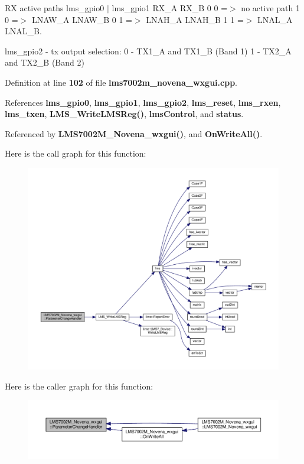 RX active paths lms\+\_\+gpio0 $\vert$ lms\+\_\+gpio1 R\+X\+\_\+A R\+X\+\_\+B 0 0 =$>$ no active path 1 0 =$>$ L\+N\+A\+W\+\_\+A L\+N\+A\+W\+\_\+B 0 1 =$>$ L\+N\+A\+H\+\_\+A L\+N\+A\+H\+\_\+B 1 1 =$>$ L\+N\+A\+L\+\_\+A L\+N\+A\+L\+\_\+B. 

lms\+\_\+gpio2 -\/ tx output selection\+: 0 -\/ T\+X1\+\_\+A and T\+X1\+\_\+B (Band 1) 1 -\/ T\+X2\+\_\+A and T\+X2\+\_\+B (Band 2) 

Definition at line {\bf 102} of file {\bf lms7002m\+\_\+novena\+\_\+wxgui.\+cpp}.



References {\bf lms\+\_\+gpio0}, {\bf lms\+\_\+gpio1}, {\bf lms\+\_\+gpio2}, {\bf lms\+\_\+reset}, {\bf lms\+\_\+rxen}, {\bf lms\+\_\+txen}, {\bf L\+M\+S\+\_\+\+Write\+L\+M\+S\+Reg()}, {\bf lms\+Control}, and {\bf status}.



Referenced by {\bf L\+M\+S7002\+M\+\_\+\+Novena\+\_\+wxgui()}, and {\bf On\+Write\+All()}.



Here is the call graph for this function\+:
\nopagebreak
\begin{figure}[H]
\begin{center}
\leavevmode
\includegraphics[width=350pt]{d1/d8c/classLMS7002M__Novena__wxgui_a1176f1816b70793737f520ee9cac5e85_cgraph}
\end{center}
\end{figure}




Here is the caller graph for this function\+:
\nopagebreak
\begin{figure}[H]
\begin{center}
\leavevmode
\includegraphics[width=350pt]{d1/d8c/classLMS7002M__Novena__wxgui_a1176f1816b70793737f520ee9cac5e85_icgraph}
\end{center}
\end{figure}


